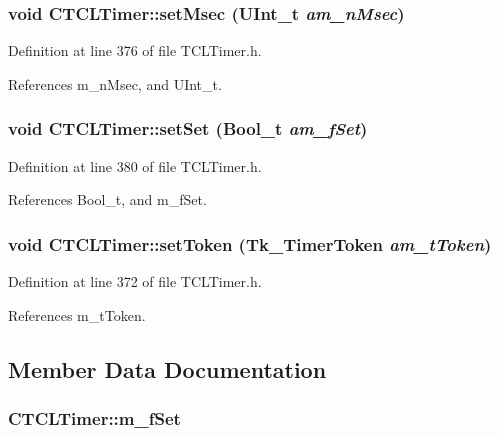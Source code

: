 \subsubsection{\setlength{\rightskip}{0pt plus 5cm}void CTCLTimer::set\-Msec ({\bf UInt\_\-t} {\em am\_\-n\-Msec})\hspace{0.3cm}{\tt  [inline, protected]}}\label{classCTCLTimer_b1}




Definition at line 376 of file TCLTimer.h.

References m\_\-n\-Msec, and UInt\_\-t.
\subsubsection{\setlength{\rightskip}{0pt plus 5cm}void CTCLTimer::set\-Set ({\bf Bool\_\-t} {\em am\_\-f\-Set})\hspace{0.3cm}{\tt  [inline, protected]}}\label{classCTCLTimer_b2}




Definition at line 380 of file TCLTimer.h.

References Bool\_\-t, and m\_\-f\-Set.
\subsubsection{\setlength{\rightskip}{0pt plus 5cm}void CTCLTimer::set\-Token (Tk\_\-Timer\-Token {\em am\_\-t\-Token})\hspace{0.3cm}{\tt  [inline, protected]}}\label{classCTCLTimer_b0}




Definition at line 372 of file TCLTimer.h.

References m\_\-t\-Token.

\subsection{Member Data Documentation}
\subsubsection{ CTCLTimer::m\_\-f\-Set\hspace{0.3cm}{\tt  [private]}}\label{classCTCLTimer_o2}




